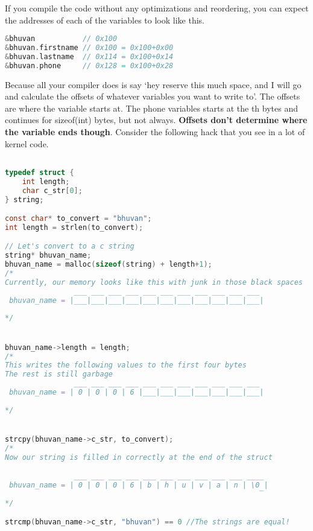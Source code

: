 If you compile the code without any optimizations and reordering, you can expect the addresses of each of the variables to look like this.

\begin{lstlisting}[language=C]
&bhuvan           // 0x100
&bhuvan.firstname // 0x100 = 0x100+0x00
&bhuvan.lastname  // 0x114 = 0x100+0x14
&bhuvan.phone     // 0x128 = 0x100+0x28
\end{lstlisting}

Because all your compiler does is say `hey reserve this much space, and I will go and calculate the offsets of whatever variables you want to write to'. The offsets are where the variable starts at. The phone variables starts at the th bytes and continues for sizeof(int) bytes, but not always. \textbf{Offsets don't determine where the variable ends though}. Consider the following hack that you see in a lot of kernel code.

\begin{lstlisting}[language=C]

typedef struct {
    int length;
    char c_str[0];
} string;

const char* to_convert = "bhuvan";
int length = strlen(to_convert);

// Let's convert to a c string
string* bhuvan_name;
bhuvan_name = malloc(sizeof(string) + length+1);
/*
Currently, our memory looks like this with junk in those black spaces
                ___ ___ ___ ___ ___ ___ ___ ___ ___ ___ ___
 bhuvan_name = |___|___|___|___|___|___|___|___|___|___|___|
                                                           
*/


bhuvan_name->length = length;
/*
This writes the following values to the first four bytes
The rest is still garbage
                ___ ___ ___ ___ ___ ___ ___ ___ ___ ___ ___
 bhuvan_name = | 0 | 0 | 0 | 6 |___|___|___|___|___|___|___|
                                                           
*/


strcpy(bhuvan_name->c_str, to_convert);
/*
Now our string is filled in correctly at the end of the struct

                ___ ___ ___ ___ ___ ___ ___ ___ ___ ___ ____
 bhuvan_name = | 0 | 0 | 0 | 6 | b | h | u | v | a | n | \0 |
                                                           ‾
*/

strcmp(bhuvan_name->c_str, "bhuvan") == 0 //The strings are equal!
\end{lstlisting}

